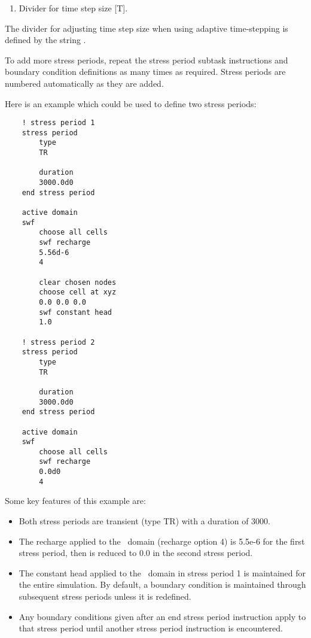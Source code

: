     {
        \squish
        \begin{enumerate}
        \item {}  Divider for time step size [T].
        \end{enumerate}
        The divider for adjusting time step size when using adaptive time-stepping is defined by the string .
    }

To add more stress periods, repeat the \textsf{stress period} subtask instructions and boundary condition definitions as many times as required.  Stress periods are numbered automatically as they are added.

Here is an example which could be used to define two stress periods:
\begin{verbatim}
    ! stress period 1
    stress period
        type
        TR

        duration
        3000.0d0
    end stress period

    active domain
    swf
        choose all cells
        swf recharge
        5.56d-6
        4

        clear chosen nodes
        choose cell at xyz
        0.0 0.0 0.0
        swf constant head
        1.0

    ! stress period 2
    stress period
        type
        TR

        duration
        3000.0d0
    end stress period

    active domain
    swf
        choose all cells
        swf recharge
        0.0d0
        4
\end{verbatim}

Some key features of this example are:
\begin{itemize}
    \item Both stress periods are transient (type TR) with a duration of 3000.
    \item The recharge applied to the \swf\ domain (recharge option 4) is 5.5e-6 for the first stress period, then is reduced to 0.0 in the second stress period.
    \item The constant head applied to the \swf\ domain in stress period 1 is maintained for the entire simulation.  By default, a boundary condition is maintained through subsequent stress periods unless it is redefined.
    \item Any boundary conditions given after an \textsf{end stress period} instruction apply to that stress period until another \textsf{stress period} instruction is encountered.
\end{itemize}


    

